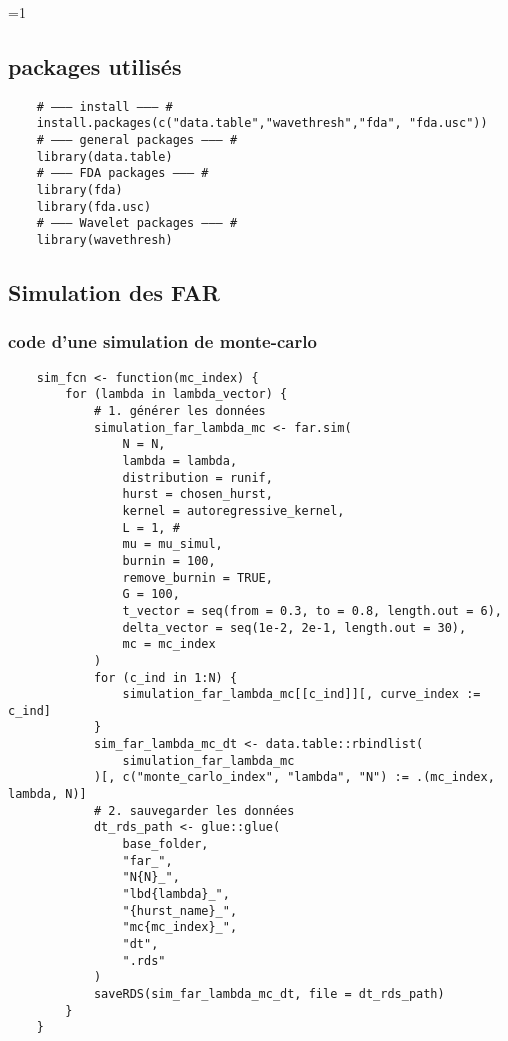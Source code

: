 \ifnum\value{code}=1
	\subsection{packages utilisés}
	\begin{verbatim}
    # ——— install ——— #
    install.packages(c("data.table","wavethresh","fda", "fda.usc"))
    # ——— general packages ——— #
    library(data.table)
    # ——— FDA packages ——— #
    library(fda)
    library(fda.usc)
    # ——— Wavelet packages ——— #
    library(wavethresh)
\end{verbatim}

	\subsection{Simulation des FAR}

	\subsubsection{code d'une simulation de monte-carlo}

	\begin{verbatim}
	sim_fcn <- function(mc_index) {
        for (lambda in lambda_vector) {
            # 1. générer les données
            simulation_far_lambda_mc <- far.sim(
                N = N,
                lambda = lambda,
                distribution = runif, 
                hurst = chosen_hurst, 
                kernel = autoregressive_kernel,
                L = 1, # 
                mu = mu_simul,
                burnin = 100,
                remove_burnin = TRUE,
                G = 100,
                t_vector = seq(from = 0.3, to = 0.8, length.out = 6),
                delta_vector = seq(1e-2, 2e-1, length.out = 30),
                mc = mc_index
            )
            for (c_ind in 1:N) {
                simulation_far_lambda_mc[[c_ind]][, curve_index := c_ind]
            }
            sim_far_lambda_mc_dt <- data.table::rbindlist(
                simulation_far_lambda_mc
            )[, c("monte_carlo_index", "lambda", "N") := .(mc_index, lambda, N)]
            # 2. sauvegarder les données
            dt_rds_path <- glue::glue(
                base_folder,
                "far_",
                "N{N}_",
                "lbd{lambda}_",
                "{hurst_name}_",
                "mc{mc_index}_",
                "dt",
                ".rds"
            )
            saveRDS(sim_far_lambda_mc_dt, file = dt_rds_path)
        }
    }
	\end{verbatim}


